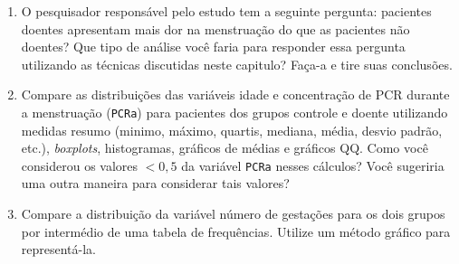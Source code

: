 \documentclass[
]{latex/krantz}
\providecommand{\tightlist}{%
  \setlength{\itemsep}{0pt}\setlength{\parskip}{0pt}}
\theoremstyle{definition}
\theoremstyle{definition}
\theoremstyle{definition}
\theoremstyle{definition}
\theoremstyle{remark}
\begin{document}
\begin{enumerate}
\def\labelenumi{\alph{enumi})}
\tightlist
\item
  O pesquisador responsável pelo estudo tem a seguinte pergunta: pacientes doentes apresentam mais dor na menstruação do que as pacientes não doentes? Que tipo de análise você faria para responder essa pergunta utilizando as técnicas discutidas neste capitulo? Faça-a e tire suas conclusões.
\item
  Compare as distribuições das variáveis idade e concentração de PCR durante a menstruação (\texttt{PCRa}) para pacientes dos grupos controle e doente utilizando medidas resumo (minimo, máximo, quartis, mediana, média, desvio padrão, etc.), \emph{boxplots}, histogramas, gráficos de médias e gráficos QQ. Como você considerou os valores \(< 0,5\) da variável \texttt{PCRa} nesses cálculos? Você sugeriria uma outra maneira para considerar tais valores?
\item
  Compare a distribuição da variável número de gestações para os dois grupos por intermédio de uma tabela de frequências. Utilize um método gráfico para representá-la.
\end{enumerate}
\end{document}
